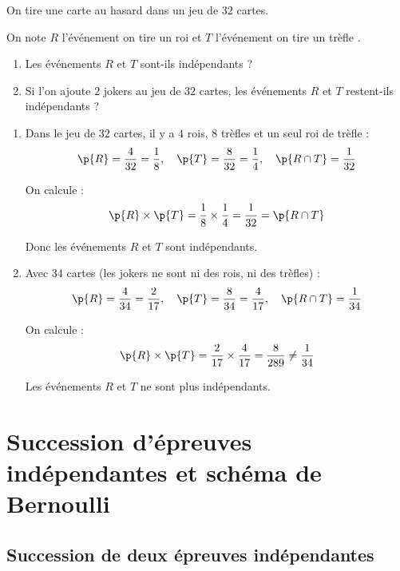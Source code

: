 \begin{methode}
	On tire une carte au hasard dans un jeu de $32$ cartes.

	On note $R$ l'événement \og on tire un roi \fg{} et $T$ l'événement \og on tire un trèfle \fg{}.

	\begin{enumerate}
		\item Les événements $R$ et $T$ sont-ils indépendants ?
		\item Si l'on ajoute $2$ jokers au jeu de $32$ cartes, les événements $R$ et $T$ restent-ils indépendants ?
	\end{enumerate}

	\begin{correction}
		\nline
		\begin{enumerate}
			\item Dans le jeu de $32$ cartes, il y a $4$ rois, $8$ trèfles et un seul roi de trèfle :
			      \[
				      \p{R} = \dfrac{4}{32} = \dfrac{1}{8}, \quad \p{T} = \dfrac{8}{32} = \dfrac{1}{4}, \quad \p{R \cap T} = \dfrac{1}{32}
			      \]

			      On calcule :
			      \[
				      \p{R} \times \p{T} = \dfrac{1}{8} \times \dfrac{1}{4} = \dfrac{1}{32} = \p{R \cap T}
			      \]

			      Donc les événements $R$ et $T$ sont indépendants.

			\item Avec $34$ cartes (les jokers ne sont ni des rois, ni des trèfles) :
			      \[
				      \p{R} = \dfrac{4}{34} = \dfrac{2}{17}, \quad \p{T} = \dfrac{8}{34} = \dfrac{4}{17}, \quad \p{R \cap T} = \dfrac{1}{34}
			      \]

			      On calcule :
			      \[
				      \p{R} \times \p{T} = \dfrac{2}{17} \times \dfrac{4}{17} = \dfrac{8}{289} \neq \dfrac{1}{34}
			      \]

			      Les événements $R$ et $T$ ne sont plus indépendants.
		\end{enumerate}
	\end{correction}
\end{methode}

\section{Succession d'épreuves indépendantes et schéma de Bernoulli}

\subsection{Succession de deux épreuves indépendantes}

